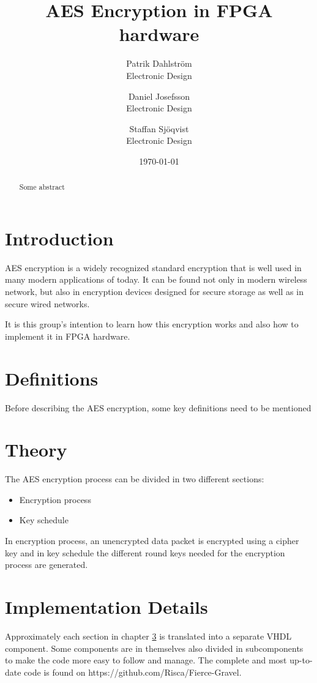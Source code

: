 \documentclass{report}
\title{AES Encryption in FPGA hardware}
\author{
        Patrik Dahlström \\
        Electronic Design\\
            \and
        Daniel Josefsson\\
        Electronic Design\\
            \and
        Staffan Sjöqvist\\
        Electronic Design
}}
\date{\today}
\begin{document}
\maketitle

\begin{abstract}
Some abstract
\end{abstract}

\chapter{Introduction}
AES encryption is a widely recognized standard encryption that is well used in many modern applications of today. It can be found not only in modern wireless network, but also in encryption devices designed for secure storage as well as in secure wired networks.

It is this group's intention to learn how this encryption works and also how to implement it in FPGA hardware.

\chapter{Definitions}
Before describing the AES encryption, some key definitions need to be mentioned



\chapter{Theory} \label{sec:theory}
The AES encryption process can be divided in two different sections:
\begin{itemize}
\item Encryption process
\item Key schedule
\end{itemize}
In encryption process, an unencrypted data packet is encrypted using a cipher key and in key schedule the different round keys needed for the encryption process are generated.





\chapter{Implementation Details}
Approximately each section in chapter \ref{sec:theory} is translated into a separate VHDL component. Some components are in themselves also divided in subcomponents to make the code more easy to follow and manage. The complete and most up-to-date code is found on https://github.com/Risca/Fierce-Gravel.
\end{document}

